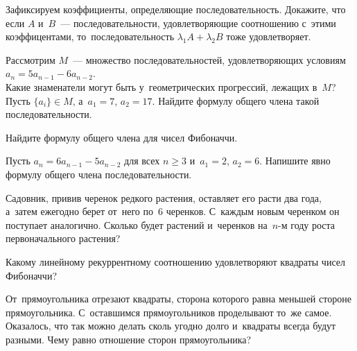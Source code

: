 \begin{problems}

\item
Зафиксируем коэффициенты, определяющие последовательность.
Докажите, что если $A$ и~$B$~--- последовательности, удовлетворяющие
соотношению с~этими коэффицентами, то~последовательность
$\lambda_1 A + \lambda_2 B$ тоже удовлетворяет.

\item
Рассмотрим $M$~--- множество последовательностей, удовлетворяющих условиям
$a_{n} = 5 a_{n-1} - 6 a_{n-2}$.
\\
\subproblem
Какие знаменатели могут быть у~геометрических прогрессий, лежащих в~$M$?
\\
\subproblem
Пусть $\{ a_i \} \in M$, а~$a_1 = 7$, $a_2 = 17$.
Найдите формулу общего члена такой последовательности.

\item
Найдите формулу общего члена для чисел Фибоначчи.

\item
Пусть $a_{n} = 6 a_{n-1} - 5 a_{n-2}$ для всех $n \geq 3$
и~$a_1 = 2$, $a_2 = 6$.
Напишите явно формулу общего члена последовательности.

\item
Садовник, привив черенок редкого растения, оставляет его
расти два года, а~затем ежегодно берет от~него по~6 черенков.
С~каждым новым черенком он поступает аналогично.
Сколько будет растений и~черенков на~$n$-м году роста первоначального растения?

\item
Какому линейному рекуррентному соотношению удовлетворяют квадраты чисел
Фибоначчи?

\item
От~прямоугольника отрезают квадраты, сторона которого равна меньшей стороне
прямоугольника.
С~оставшимся прямоугольников проделывают то~же самое.
Оказалось, что так можно делать сколь угодно долго и~квадраты всегда будут
разными.
Чему равно отношение сторон прямоугольника?

\end{problems}

